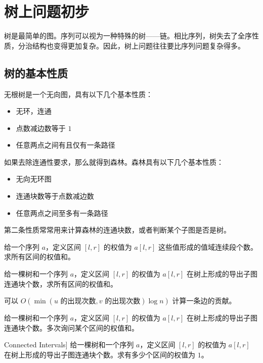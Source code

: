\chapter{树上问题初步}

树是最简单的图。序列可以视为一种特殊的树——链。相比序列，树失去了全序性质，分治结构也变得更加复杂。因此，树上问题往往要比序列问题复杂得多。


\section{树的基本性质}

无根树是一个无向图，具有以下几个基本性质：
\begin{itemize}
    \item 无环，连通
    \item 点数减边数等于 $1$
    \item 任意两点之间有且仅有一条路径
\end{itemize}

如果去除连通性要求，那么就得到森林。森林具有以下几个基本性质：
\begin{itemize}
    \item 无向无环图
    \item 连通块数等于点数减边数
    \item 任意两点之间至多有一条路径
\end{itemize}
    
第二条性质常常用来计算森林的连通块数，或者判断某个子图是否是树。
\begin{example}[ABC390F]
    给一个序列 $a$，定义区间 $[l,r]$ 的权值为 $a[l,r]$ 这些值形成的值域连续段个数。求所有区间的权值和。
\end{example}
\begin{exercise}
    给一棵树和一个序列 $a$，定义区间 $[l,r]$ 的权值为 $a[l,r]$ 在树上形成的导出子图连通块个数，求所有区间的权值和。
    \begin{hint}
        可以 $O(\min(u\text{ 的出现次数}, v\text{ 的出现次数})\log n)$ 计算一条边的贡献。
    \end{hint}
\end{exercise}
\begin{exercise}
    给一棵树和一个序列 $a$，定义区间 $[l,r]$ 的权值为 $a[l,r]$ 在树上形成的导出子图连通块个数。多次询问某个区间的权值和。
\end{exercise}
\begin{exercise}[[SDCPC 2019] Connected Intervals]
    给一棵树和一个序列 $a$，定义区间 $[l,r]$ 的权值为 $a[l,r]$ 在树上形成的导出子图连通块个数。求有多少个区间的权值为 $1$。
\end{exercise}

